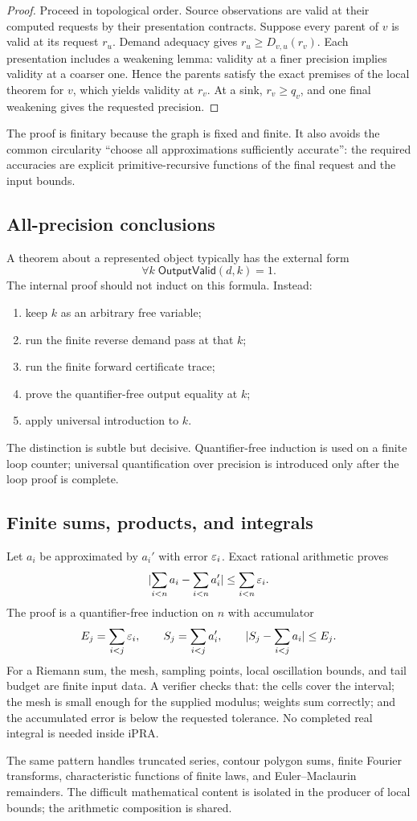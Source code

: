 \begin{proof}
Proceed in topological order.  Source observations are valid at their
computed requests by their presentation contracts.  Suppose every parent of
\(v\) is valid at its request \(r_u\).  Demand adequacy gives
\(r_u\ge D_{v,u}(r_v)\).  Each presentation includes a weakening lemma:
validity at a finer precision implies validity at a coarser one.  Hence the
parents satisfy the exact premises of the local theorem for \(v\), which
yields validity at \(r_v\).  At a sink, \(r_v\ge q_v\), and one final weakening
gives the requested precision.
\end{proof}

The proof is finitary because the graph is fixed and finite.  It also avoids
the common circularity ``choose all approximations sufficiently accurate'':
the required accuracies are explicit primitive-recursive functions of the
final request and the input bounds.

\subsection{All-precision conclusions}

A theorem about a represented object typically has the external form
\[
        \forall k\; \mathsf{OutputValid}(d,k)=1.
\]
The internal proof should not induct on this formula.  Instead:

\begin{enumerate}[label=\arabic*.]
\item keep \(k\) as an arbitrary free variable;
\item run the finite reverse demand pass at that \(k\);
\item run the finite forward certificate trace;
\item prove the quantifier-free output equality at \(k\);
\item apply universal introduction to \(k\).
\end{enumerate}

The distinction is subtle but decisive.  Quantifier-free induction is used on
a finite loop counter; universal quantification over precision is introduced
only after the loop proof is complete.

\subsection{Finite sums, products, and integrals}

Let \(a_i\) be approximated by \(a_i'\) with error \(\varepsilon_i\).  Exact rational
arithmetic proves
\[
   \lvert \sum_{i<n} a_i-\sum_{i<n}a_i'\rvert
      \le \sum_{i<n}\varepsilon_i.
\]
The proof is a quantifier-free induction on \(n\) with accumulator
\[
 E_j=\sum_{i<j}\varepsilon_i,\qquad
 S_j=\sum_{i<j}a_i',\qquad
 \lvert S_j-\sum_{i<j}a_i\rvert\le E_j.
\]
For a Riemann sum, the mesh, sampling points, local oscillation bounds, and
tail budget are finite input data.  A verifier checks that:
the cells cover the interval; the mesh is small enough for the supplied
modulus; weights sum correctly; and the accumulated error is below the
requested tolerance.  No completed real integral is needed inside iPRA.

The same pattern handles truncated series, contour polygon sums, finite
Fourier transforms, characteristic functions of finite laws, and
Euler--Maclaurin remainders.  The difficult mathematical content is isolated
in the producer of local bounds; the arithmetic composition is shared.
